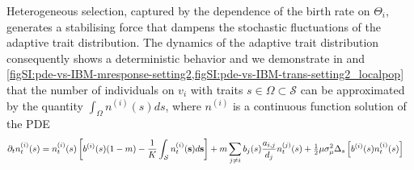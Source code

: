   Heterogeneous selection, captured by the dependence of the birth rate on $\Theta_i$, generates a stabilising force  that dampens the stochastic fluctuations of the adaptive trait distribution. The dynamics of the adaptive trait distribution consequently shows a deterministic behavior and we demonstrate in  and \cref{figSI:pde-vs-IBM-mresponse-setting2,figSI:pde-vs-IBM-trans-setting2_localpop} that the number of individuals on $v_i$ with traits $s \in \Omega \subset \mathcal{S}$ can be approximated by the quantity $\int_\Omega n^{(i)}(s)ds$, where $n^{(i)}$ is a continuous function solution of the PDE
  \begin{equation}\label{eq:PDE_adapt}
  \begin{split}
	\partial_t n_t^{(i)}(s) &= n_t^{(i)} (s) \left[b^{(i)}(s)(1-m) - \frac{1}{K}\int_\mathcal{S}  n_t^{(i)}({\textbf s}) d{\textbf s}  \right] + m \sum_{j\neq i} b_j(s) \frac{a_{i,j}}{d_j} n_t^{(j)}(s) + \tfrac{1}{2} \mu \sigma_\mu^2 \Delta_s \left[ b^{(i)}(s) n^{(i)}_t(s) \right]
	\end{split}
  \end{equation}
  
